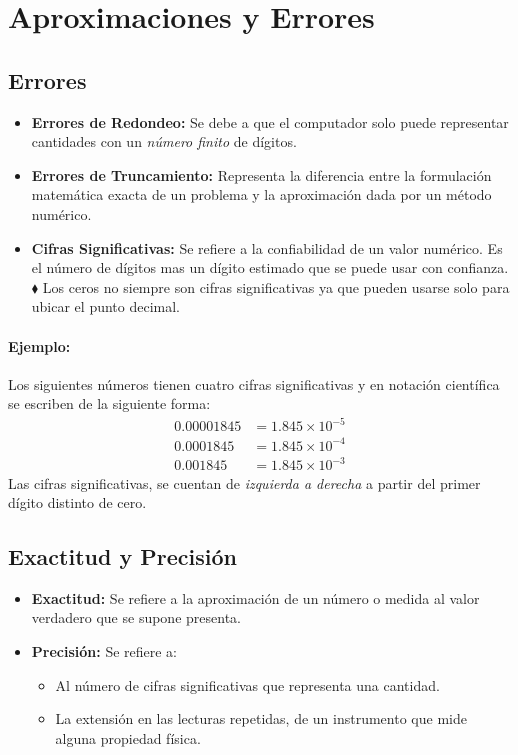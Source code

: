 \chapter{Aproximaciones y Errores}
\section{Errores}
\begin{itemize}
\item \textbf{Errores de Redondeo:} Se debe a que el computador solo puede representar cantidades con un \textit{número finito }de dígitos.
\item \textbf{Errores de Truncamiento:} Representa la diferencia entre la formulación  matemática exacta de un problema y la aproximación dada por un método numérico.
\item \textbf{Cifras Significativas:} Se refiere a la confiabilidad de un valor numérico. Es el número de dígitos mas un dígito estimado que se puede usar con confianza.\\${ }$\\
$\blacklozenge$ Los ceros no siempre son cifras significativas ya que pueden usarse solo para ubicar el punto decimal. 
\end{itemize}
\subsubsection{Ejemplo:}
Los siguientes números tienen cuatro cifras significativas y en notación científica se escriben de la siguiente forma:
\begin{align*}
0.00001845 &= 1.845 \times 10^{-5} \\
0.0001845  &= 1.845 \times 10^{-4} \\
0.001845   &= 1.845 \times 10^{-3}
\end{align*}
Las cifras significativas, se cuentan de \textit{izquierda a derecha} a partir del primer dígito distinto de cero.

\section{Exactitud y Precisión}
\begin{itemize}
\item \textbf{Exactitud:} Se refiere a la aproximación de un número o medida al valor verdadero que se supone presenta.
\item \textbf{Precisión:} Se refiere a:
\begin{itemize}
\item Al número de cifras significativas que representa una cantidad.
\item La extensión en las lecturas repetidas, de un instrumento que mide alguna propiedad física.
\end{itemize}
\end{itemize}
